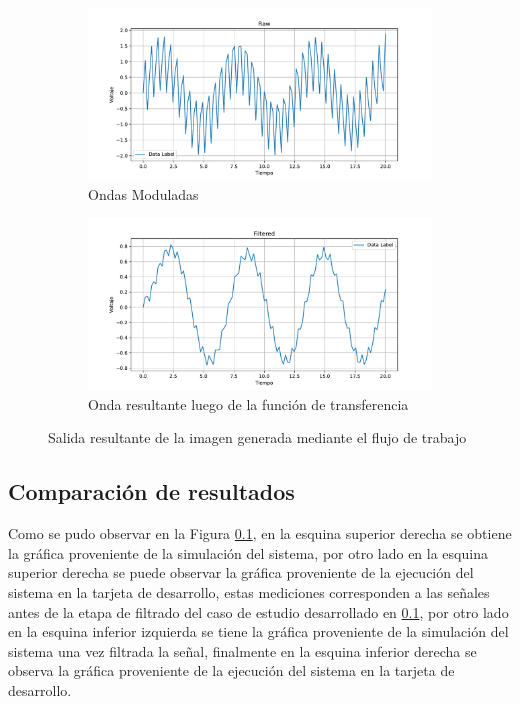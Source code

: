 \begin{figure}[htbp]
    \centering
    \begin{subfigure}[b]{0.45\textwidth}
        \centering
        \includegraphics[width=\textwidth]{fig/especifico_2/raw.pdf}
        \caption{Ondas Moduladas}
        \label{fig:onda_modulada_zedboard}
    \end{subfigure}
    \hfill
    \begin{subfigure}[b]{0.45\textwidth}
        \centering
        \includegraphics[width=\textwidth]{fig/especifico_2/Filtered.pdf}
        \caption{Onda resultante luego de la función de transferencia}
        \label{fig:onda_filtrada_zedboard}
    \end{subfigure}
    \caption{Salida resultante de la imagen generada mediante el flujo de trabajo}
    \label{fig:salida_resultante_diagrama_graficos_zedboard}
\end{figure}

\subsection{Comparación de resultados}

Como se pudo observar en la Figura \ref{}, en la esquina superior derecha se obtiene la gráfica proveniente de la simulación del sistema, por otro lado en la esquina superior derecha se puede observar la gráfica proveniente de la ejecución del sistema en la tarjeta de desarrollo, estas mediciones corresponden a las señales antes de la etapa de filtrado del caso de estudio desarrollado en \ref{}, por otro lado en la esquina inferior izquierda se tiene la  gráfica proveniente de la simulación del sistema una vez filtrada la señal, finalmente en la esquina inferior derecha se observa la gráfica proveniente de la ejecución del sistema en la tarjeta de desarrollo. 

